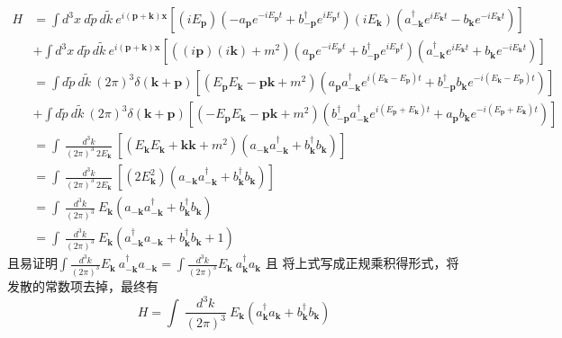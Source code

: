 \documentclass{article}
\begin{document}
\begin{align}
H 	&= \int d^3 x \: d \widetilde{p} \: d \widetilde{k} \: e^{i(\mathbf{p} +  \mathbf{k}) \mathbf{x}} 		\left[ 	(i E_{\mathbf{p}})\left( 
		- a_{\mathbf{p}} e^{-i E_{\mathbf{p}}t} +  b^{\dagger}_{-\mathbf{p}} e^{i E_{\mathbf{p}}t} \right)
			(i E_{\mathbf{k}}) \left( 
a^{\dagger}_{-\mathbf{k}} e^{i E_{\mathbf{k}}t} -  b_{\mathbf{k}} e^{-i E_{\mathbf{k}}t} \right) \right] \nonumber \\
	&+\int d^3 x \: d \widetilde{p} \: d \widetilde{k} \: e^{i(\mathbf{p} +  \mathbf{k}) \mathbf{x}} \left[ 
	 ((i  \mathbf{p})(i  \mathbf{k}) +m^2 )\left(
		a_{\mathbf{p}} e^{-i E_{\mathbf{p}}t} +  b^{\dagger}_{-\mathbf{p}} e^{i E_{\mathbf{p}}t} \right) 
		\left(
		a^{\dagger}_{-\mathbf{k}} e^{i E_{\mathbf{k}}t} +  b_{\mathbf{k}} e^{-i E_{\mathbf{k}}t} \right) 
	\right] \nonumber \\
	&= \int d \widetilde{p} \: d \widetilde{k} \: (2 \pi)^3 \delta(\mathbf{k} + \mathbf{p})\left[ 
	 (E_{\mathbf{p}} E_{\mathbf{k}} -\mathbf{p} \mathbf{k} + m^2)
	 (a_{\mathbf{p}} a^{\dagger}_{-\mathbf{k}} e^{i(E_{\mathbf{k}}-E_{\mathbf{p}})t}+ b^{\dagger}_{-\mathbf{p}} b_{\mathbf{k}}e^{-i(E_{\mathbf{k}}-E_{\mathbf{p}})t}) \right]\nonumber \\
	 & + \int d \widetilde{p} \: d \widetilde{k} \: (2 \pi)^3 \delta(\mathbf{k} + \mathbf{p})\left[ 
	 (-E_{\mathbf{p}} E_{\mathbf{k}} -\mathbf{p} \mathbf{k} + m^2)
	  ( b^{\dagger}_{-\mathbf{p}} a^{\dagger}_{-\mathbf{k}} e^{i (E_{\mathbf{p}}+E_{\mathbf{k}})t} +a_{\mathbf{p}}b_{\mathbf{k}} e^{-i (E_{\mathbf{p}}+E_{\mathbf{k}})t})
	\right] \nonumber \\
	&= \int \: \frac{d^3 k }{(2 \pi)^3 \: 2 E_{\mathbf{k}}} \:\left[ 
	 (E_{\mathbf{k}} E_{\mathbf{k}} +\mathbf{k} \mathbf{k} + m^2)
	 (a_{-\mathbf{k}} a^{\dagger}_{-\mathbf{k}} + b^{\dagger}_{\mathbf{k}} b_{\mathbf{k}}) \right] \nonumber \\
	&=\int \: \frac{d^3 k }{(2 \pi)^3 \: 2 E_{\mathbf{k}}} \:\left[ 
	 (2E_{\mathbf{k}}^2)
	 (a_{-\mathbf{k}} a^{\dagger}_{-\mathbf{k}} + b^{\dagger}_{\mathbf{k}} b_{\mathbf{k}}) \right] \nonumber \\
	&=\int \: \frac{d^3 k }{(2 \pi)^3 } \:
	 E_{\mathbf{k}}
	 (a_{-\mathbf{k}} a^{\dagger}_{-\mathbf{k}} + b^{\dagger}_{\mathbf{k}} b_{\mathbf{k}})  \nonumber \\
	&=\int \: \frac{d^3 k }{(2 \pi)^3 } \:
	 E_{\mathbf{k}}
	 ( a^{\dagger}_{-\mathbf{k}} a_{-\mathbf{k}}+ b^{\dagger}_{\mathbf{k}} b_{\mathbf{k}} +1)  \nonumber
\end{align}
且易证明$\int \frac{d^3 k }{(2 \pi)^3 } E_{\mathbf{k}}\:a^{\dagger}_{-\mathbf{k}} a_{-\mathbf{k}} = \int \frac{d^3 k }{(2 \pi)^3 } E_{\mathbf{k}}\:a^{\dagger}_{\mathbf{k}} a_{\mathbf{k}}$ 且 将上式写成正规乘积得形式，将发散的常数项去掉，最终有
$$H = \int \: \frac{d^3 k }{(2 \pi)^3 } \:
	 E_{\mathbf{k}}
	 ( a^{\dagger}_{\mathbf{k}} a_{\mathbf{k}}+ b^{\dagger}_{\mathbf{k}} b_{\mathbf{k}}) $$
\end{document}
